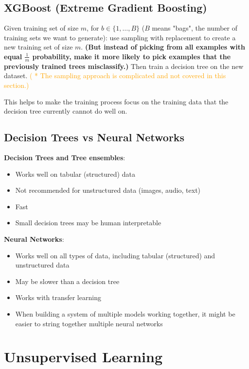 \documentclass{article}
\begin{document}
\subsection{XGBoost (Extreme Gradient Boosting)}

\noindent Given training set of size \(m\), for \(b \in \{1, \dots, B\}\) (\(B\) means "bags", the number of training sets we want to generate): use sampling with replacement to create a new training set of size \(m\). \textbf{(But instead of picking from all examples with equal \(\frac{1}{m}\) probability, make it more likely to pick examples that the previously trained trees misclassify.)} Then train a decision tree on the new dataset. \textcolor{orange}{( * The sampling approach is complicated and not covered in this section.)}

\bigskip

\noindent This helps to make the training process focus on the training data that the decision tree currently cannot do well on.

\subsection{Decision Trees vs Neural Networks}

\noindent \textbf{Decision Trees and Tree ensembles}:
\begin{itemize}
    \item Works well on tabular (structured) data
    \item Not recommended for unstructured data (images, audio, text)
    \item Fast
    \item Small decision trees may be human interpretable
\end{itemize}

\noindent \textbf{Neural Networks}:
\begin{itemize}
    \item Works well on all types of data, including tabular (structured) and unstructured data
    \item May be slower than a decision tree
    \item Works with transfer learning
    \item When building a system of multiple models working together, it might be easier to string together multiple neural networks
\end{itemize}

\section{Unsupervised Learning}
\end{document}
